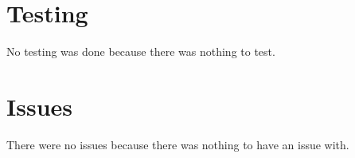 \documentclass[sigconf]{acmart}
\begin{document}

\section{Testing}
No testing was done because there was nothing to test.

\section{Issues}
There were no issues because there was nothing to have an issue with.
\end{document}
